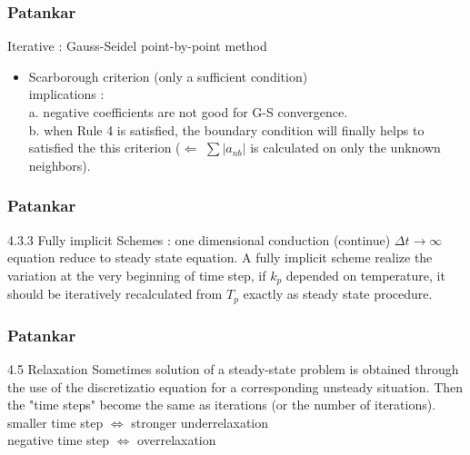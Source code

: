 \documentclass{beamer}
\begin{document}
\begin{frame}
\frametitle{Patankar}
\begin{block}{Iterative : Gauss-Seidel point-by-point method}
\begin{itemize}
	\item Scarborough criterion (only a sufficient condition)\\
	implications : \\
	a. negative coefficients are not good for G-S convergence. \\
	b. when Rule 4 is satisfied, the boundary condition will finally helps to satisfied the this criterion ($\Leftarrow$ $\sum{|a_{nb}|}$ is calculated on only the unknown neighbors).
\end{itemize}
\end{block}

\end{frame}

\begin{frame}
\frametitle{Patankar}
\begin{block}{4.3.3 Fully implicit Schemes : one dimensional conduction (continue)}
	$\Delta t \to \infty$ equation reduce to steady state equation.
	A fully implicit scheme realize the variation at the very beginning of time step, if $k_p$ depended on temperature, it should be iteratively recalculated from $T_p$ exactly as steady state procedure. 
\end{block}
\end{frame}


\begin{frame}
\frametitle{Patankar}
\begin{block}{4.5 Relaxation}
	Sometimes solution of a steady-state problem is obtained through the use of the discretizatio equation for a corresponding unsteady situation. Then the "time steps" become the same as iterations (or the number of iterations).\\
	smaller time step $\iff$ stronger underrelaxation \\
	negative time step $\iff$ overrelaxation
\end{block}
\end{frame}

\end{document}
